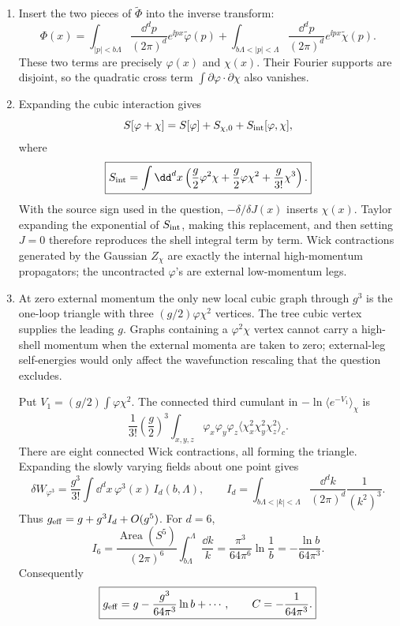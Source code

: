 
\begin{enumerate}
  \begin{enumerate}
    \item[(a)]
    Insert the two pieces of \(\widetilde\Phi\) into the inverse transform:
    \[
      \Phi(x)=\int_{|p|<b\Lambda}\frac{\dd^dp}{(2\pi)^d}
        e^{\ii px}\widetilde\varphi(p)
      +\int_{b\Lambda<|p|<\Lambda}\frac{\dd^dp}{(2\pi)^d}
        e^{\ii px}\widetilde\chi(p).
    \]
    These two terms are precisely \(\varphi(x)\) and \(\chi(x)\).
    Their Fourier supports are disjoint, so the quadratic cross term
    \(\int\partial\varphi\cdot\partial\chi\) also vanishes.
    \item[(b)]
    Expanding the cubic interaction gives
    \[
      S[\varphi+\chi]=S[\varphi]+S_{\chi,0}
        +S_{\rm int}[\varphi,\chi],
    \]
    where
    \[
      \boxed{S_{\rm int}=\int \dd^dx\left(
        \frac g2\varphi^2\chi+
        \frac g2\varphi\chi^2+
        \frac g{3!}\chi^3\right).}
    \]
    With the source sign used in the question,
    \(-\delta/\delta J(x)\) inserts \(\chi(x)\).  Taylor expanding the
    exponential of \(S_{\rm int}\), making this replacement, and then
    setting \(J=0\) therefore reproduces the shell integral term by term.
    Wick contractions generated by the Gaussian \(Z_\chi\) are exactly
    the internal high-momentum propagators; the uncontracted
    \(\varphi\)'s are external low-momentum legs.
    \item[(c)]
    At zero external momentum the only new local cubic graph through
    \(g^3\) is the one-loop triangle with three
    \((g/2)\varphi\chi^2\) vertices.  The tree cubic vertex supplies the
    leading \(g\).  Graphs containing a
    \(\varphi^2\chi\) vertex cannot carry a high-shell momentum when the
    external momenta are taken to zero; external-leg self-energies would
    only affect the wavefunction rescaling that the question excludes.

    Put \(V_1=(g/2)\int\varphi\chi^2\).  The connected third cumulant in
    \(-\ln\langle e^{-V_1}\rangle_\chi\) is
    \[
      \frac1{3!}\left(\frac g2\right)^3
      \int_{x,y,z}\varphi_x\varphi_y\varphi_z
      \langle\chi_x^2\chi_y^2\chi_z^2\rangle_c.
    \]
    There are eight connected Wick contractions, all forming the
    triangle.  Expanding the slowly varying fields about one point gives
    \[
      \delta W_{\varphi^3}
        =\frac{g^3}{3!}\int \dd^dx\,\varphi^3(x)\,I_d(b,\Lambda),
      \qquad
      I_d=\int_{b\Lambda<|k|<\Lambda}
        \frac{\dd^dk}{(2\pi)^d}\frac1{(k^2)^3}.
    \]
    Thus \(g_{\rm eff}=g+g^3I_d+O(g^5)\).  For \(d=6\),
    \[
      I_6=\frac{\operatorname{Area}(S^5)}{(2\pi)^6}
        \int_{b\Lambda}^{\Lambda}\frac{\dd k}{k}
      =\frac{\pi^3}{64\pi^6}\ln\frac1b
      =-\frac{\ln b}{64\pi^3}.
    \]
    Consequently
    \[
      \boxed{g_{\rm eff}
        =g-\frac{g^3}{64\pi^3}\ln b+\cdots,\qquad
        C=-\frac1{64\pi^3}.}
    \]
  \end{enumerate}


\end{enumerate}
